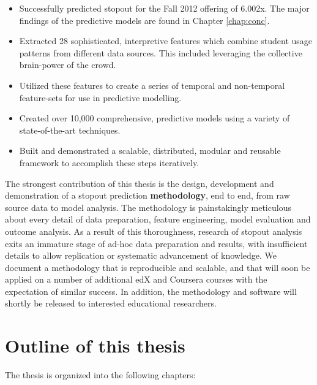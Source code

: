 \begin{itemize}
\item Successfully predicted stopout for the Fall 2012 offering of 6.002x. The major findings of the predictive models are found in Chapter \ref{chap:conc}. 
\item Extracted 28 sophisticated, interpretive features which combine student usage patterns from different data sources. This included leveraging the collective brain-power of the crowd. 
\item Utilized these features to create a series of temporal and non-temporal feature-sets for use in predictive modelling.
\item Created over 10,000 comprehensive, predictive models using a variety of state-of-the-art techniques.
\item Built and demonstrated a scalable, distributed, modular and reusable framework to accomplish these steps iteratively.
\end{itemize}

The strongest contribution of this thesis is the design, development and demonstration of a stopout prediction \textbf{methodology}, end to end, from raw source data to model analysis. The methodology is painstakingly meticulous about every detail of data preparation, feature engineering, model evaluation and outcome analysis. As a result of this thoroughness, research of stopout analysis exits an immature stage of ad-hoc data preparation and results, with insufficient details to allow replication or systematic advancement of knowledge. We document a methodology that is reproducible and scalable, and that will soon be applied on a number of additional edX and Coursera courses with the expectation of similar success. In addition, the methodology and software will shortly be released to interested educational researchers.

\section{Outline of this thesis}

The thesis is organized into the following chapters:


